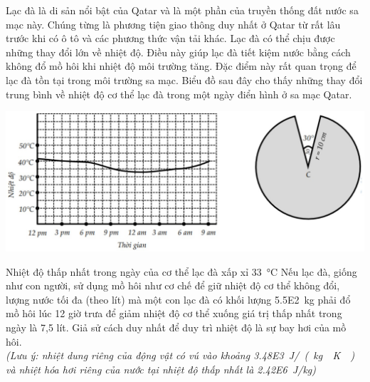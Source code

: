 \begin{ex}
\end{ex}
\begin{ex}
	Lạc đà là di sản nổi bật của Qatar và là một phần của truyền thống đất nước sa mạc này. Chúng từng là phương tiện giao thông duy nhất ở Qatar từ rất lâu trước khi có ô tô và các phương thức vận tải khác. Lạc đà có thể chịu được những thay đổi lớn về nhiệt độ. Điều này giúp lạc đà tiết kiệm nước bằng cách không đổ mồ hôi khi nhiệt độ môi trường tăng. Đặc điểm này rất quan trọng để lạc đà tồn tại trong môi trường sa mạc. Biểu đồ sau đây cho thấy những thay đổi trung bình về nhiệt độ cơ thể lạc đà trong một ngày điển hình ở sa mạc Qatar.
	\begin{center}
		\includegraphics[scale=0.4]{figs/G12Y24B5-3}
	\end{center}
	{\True Nhiệt độ thấp nhất trong ngày của cơ thể lạc đà xấp xỉ \SI{33}{\celsius}}
	{Nếu lạc đà, giống như con người, sử dụng mồ hôi như cơ chế để giữ nhiệt độ cơ thể không đổi, lượng nước tối đa (theo lít) mà một con lạc đà có khối lượng \SI{5.5E2}{\kilogram} phải đổ mồ hôi lúc 12 giờ trưa để giảm nhiệt độ cơ thể xuống giá trị thấp nhất trong ngày là 7,5 lít. Giả sử cách duy nhất để duy trì nhiệt độ là sự bay hơi của mồ hôi.\\
		\textit{(Lưu ý: nhiệt dung riêng của động vật có vú vào khoảng \SI{3.48E3}{\joule/\left(\kilogram\cdot\kelvin\right)} và nhiệt hóa hơi riêng của nước tại nhiệt độ thấp nhất là \SI{2.42E6}{\joule/\kilogram})}}

\end{ex}
